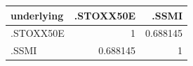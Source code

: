 \begin{tabular}{lrr}
\toprule
underlying & .STOXX50E & .SSMI \\
\midrule
.STOXX50E & 1 & 0.688145 \\
.SSMI & 0.688145 & 1 \\
\bottomrule
\end{tabular}
